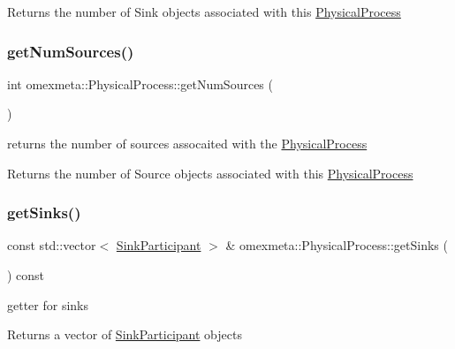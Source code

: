 \begin{DoxyReturn}{Returns}
the number of Sink objects associated with this \hyperlink{classomexmeta_1_1PhysicalProcess}{Physical\+Process} 
\end{DoxyReturn}
\mbox{\label{classomexmeta_1_1PhysicalProcess_a56459d9f0087a3f92b0aca5d148b65f5}} 
\subsubsection{\texorpdfstring{get\+Num\+Sources()}{getNumSources()}}
{\footnotesize\ttfamily int omexmeta\+::\+Physical\+Process\+::get\+Num\+Sources (\begin{DoxyParamCaption}{ }\end{DoxyParamCaption})}



returns the number of sources assocaited with the \hyperlink{classomexmeta_1_1PhysicalProcess}{Physical\+Process} 

\begin{DoxyReturn}{Returns}
the number of Source objects associated with this \hyperlink{classomexmeta_1_1PhysicalProcess}{Physical\+Process} 
\end{DoxyReturn}
\mbox{\label{classomexmeta_1_1PhysicalProcess_a069e7caa05f346f90f413f650f081535}} 
\subsubsection{\texorpdfstring{get\+Sinks()}{getSinks()}}
{\footnotesize\ttfamily const std\+::vector$<$ \hyperlink{classomexmeta_1_1SinkParticipant}{Sink\+Participant} $>$ \& omexmeta\+::\+Physical\+Process\+::get\+Sinks (\begin{DoxyParamCaption}{ }\end{DoxyParamCaption}) const}



getter for sinks 

\begin{DoxyReturn}{Returns}
a vector of \hyperlink{classomexmeta_1_1SinkParticipant}{Sink\+Participant} objects 
\end{DoxyReturn}
\mbox{\label{classomexmeta_1_1PhysicalProcess_ab5f3100febc21173775a2090bb57a0fb}} 
